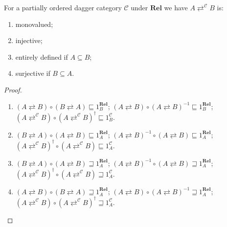 \begin{prop}
  For a partially ordered dagger category $\mathcal{C}$ under
  $\mathbf{Rel}$ we have $A \rightleftarrows^{\mathcal{C}} B$ is:
  \begin{enumerate}
    \item monovalued;
    
    \item injective;
    
    \item entirely defined if $A \subseteq B$;
    
    \item surjective if $B \subseteq A$.
  \end{enumerate}
\end{prop}

\begin{proof}
  ~
  \begin{enumerate}
    \item $(A \rightleftarrows B) \circ (B \rightleftarrows A) \sqsubseteq
    1^{\mathbf{Rel}}_B$; $(A \rightleftarrows B) \circ (A
    \rightleftarrows B)^{- 1} \sqsubseteq 1^{\mathbf{Rel}}_B$; $(A
    \rightleftarrows^{\mathcal{C}} B) \circ (A \rightleftarrows^{\mathcal{C}}
    B)^{\dagger} \sqsubseteq 1^{\mathcal{C}}_B$.
    
    \item $(B \rightleftarrows A) \circ (A \rightleftarrows B) \sqsubseteq
    1^{\mathbf{Rel}}_A$; $(A \rightleftarrows B)^{- 1} \circ (A
    \rightleftarrows B) \sqsubseteq 1^{\mathbf{Rel}}_A$; $(A
    \rightleftarrows^{\mathcal{C}} B)^{\dagger} \circ (A
    \rightleftarrows^{\mathcal{C}} B) \sqsubseteq 1^{\mathcal{C}}_A$.
    
    \item $(B \rightleftarrows A) \circ (A \rightleftarrows B) \sqsupseteq
    1^{\mathbf{Rel}}_A$; $(A \rightleftarrows B)^{- 1} \circ (A
    \rightleftarrows B) \sqsupseteq 1^{\mathbf{Rel}}_A$; $(A
    \rightleftarrows^{\mathcal{C}} B)^{\dagger} \circ (A
    \rightleftarrows^{\mathcal{C}} B) \sqsupseteq 1^{\mathcal{C}}_A$.
    
    \item $(A \rightleftarrows B) \circ (B \rightleftarrows A) \sqsupseteq
    1^{\mathbf{Rel}}_A$; $(A \rightleftarrows B) \circ (A
    \rightleftarrows B)^{- 1} \sqsupseteq 1^{\mathbf{Rel}}_A$; $(A
    \rightleftarrows^{\mathcal{C}} B) \circ (A \rightleftarrows^{\mathcal{C}}
    B)^{\dagger} \sqsupseteq 1^{\mathcal{C}}_A$.
  \end{enumerate}
\end{proof}

